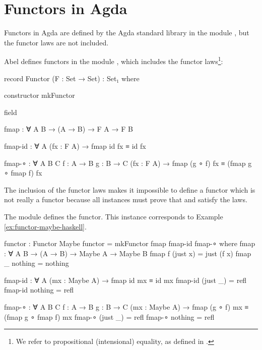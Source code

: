\section{Functors in Agda}
\label{sec:functors-agda}

Functors in Agda are defined by the Agda standard library
\parencite{danielsson-2013} in the module ,
but the functor laws are not included.

Abel defines functors in the module ,
which includes the functor laws\footnote{We refer to propositional
  (intensional) equality, as defined in \parencite[module
    ]{danielsson-2013}.}:
\begin{codeagda}
record Functor (F : Set → Set) : Set₁ where

  constructor mkFunctor

  field

    fmap    : ∀ {A B} → (A → B) → F A → F B

    fmap-id : ∀ {A} (fx : F A) → fmap id fx ≡ id fx

    fmap-∘  : ∀ {A B C} {f : A → B} {g : B → C}
              (fx : F A) → fmap (g ∘ f) fx ≡ (fmap g ∘ fmap f) fx
\end{codeagda}
The inclusion of the functor laws makes it impossible to define a
functor which is not really a functor because all instances must prove
that  and  satisfy the laws.


\begin{example}
  \label{ex:functor-maybe-agda}

  The module  defines the
   functor. This instance corresponds to Example
  \ref{ex:functor-maybe-haskell}.
  \begin{codeagda}
functor : Functor Maybe
functor = mkFunctor fmap fmap-id fmap-∘
  where
    fmap : ∀ {A B} → (A → B) → Maybe A → Maybe B
    fmap f (just x) = just (f x)
    fmap _ nothing  = nothing

    fmap-id : ∀ {A} (mx : Maybe A) → fmap id mx ≡ id mx
    fmap-id (just _) = refl
    fmap-id nothing  = refl

    fmap-∘ : ∀ {A B C} {f : A → B} {g : B → C}
             (mx : Maybe A) → fmap (g ∘ f) mx ≡ (fmap g ∘ fmap f) mx
    fmap-∘ (just _) = refl
    fmap-∘ nothing  = refl
    \end{codeagda}

\end{example}

